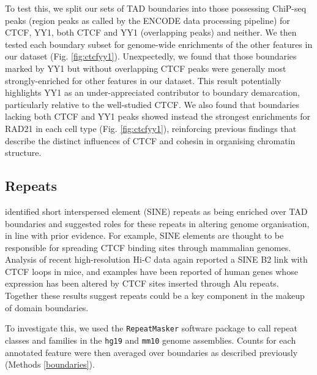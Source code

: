 \documentclass[a4paper,11pt,oneside]{book}
\begin{document}
To test this, we split our sets of TAD boundaries into those possessing
ChiP-seq peaks (region peaks as called by the ENCODE data processing pipeline\cite{Dunham2012}) for
CTCF, YY1, both CTCF and YY1 (overlapping peaks) and neither. We then
tested each boundary subset for genome-wide enrichments of the other
features in our dataset (Fig. \ref{fig:ctcfyy1}). Unexpectedly, we found that those
boundaries marked by YY1 but without overlapping CTCF peaks were
generally most strongly-enriched for other features in our dataset. This result potentially highlights YY1 as an under-appreciated contributor to boundary demarcation, particularly relative to the well-studied CTCF. We
also found that boundaries lacking both CTCF and YY1 peaks showed
instead the strongest enrichments for RAD21 in each cell type (Fig. \ref{fig:ctcfyy1}), reinforcing previous findings that describe the distinct
influences of CTCF and cohesin in organising chromatin structure.\cite{Zuin2013, Seitan2013, Phillips-Cremins2013}


\subsection{Repeats}\label{sec:repeats}

\citet{Dixon2012} identified short interspersed element (SINE) repeats as being enriched over TAD boundaries and suggested roles for these repeats in altering genome organisation, in line with prior evidence.\cite{Dixon2012, Lunyak2007} For example, SINE elements are thought to be responsible for spreading CTCF binding sites through mammalian genomes.\cite{Schmidt2012}  Analysis of recent high-resolution Hi-C data again reported a SINE B2 link with CTCF loops in mice,\cite{Rao2014} and examples have been reported of human genes whose expression has been altered by CTCF sites inserted through Alu repeats.\cite{Ruiz-Narvaez2008} Together these results suggest repeats could be a key component in the makeup of domain boundaries.

To investigate this, we used the \texttt{RepeatMasker}\cite{Tarailo-Graovac2009} software package to call repeat classes and families in the \texttt{hg19} and \texttt{mm10} genome assemblies. Counts for each annotated feature were then averaged over boundaries as described previously (Methods \ref{boundaries}).
\end{document}
